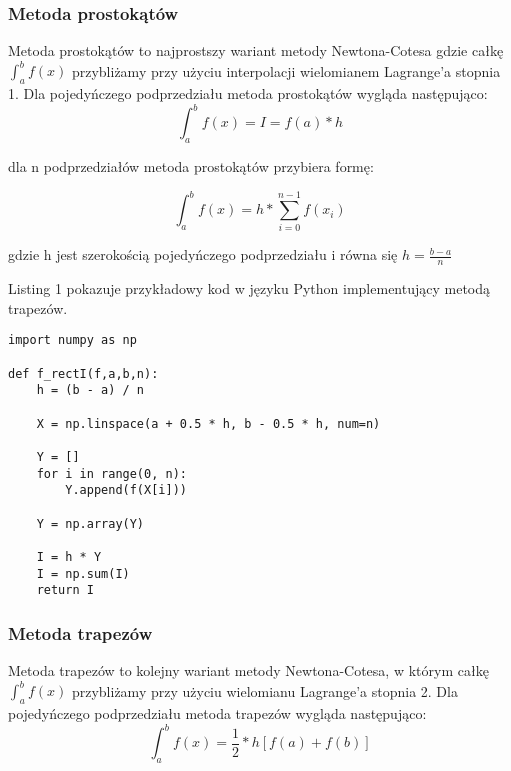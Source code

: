 \documentclass[12pt,twoside]{article}
\begin{document}
\cite{web}

\clearpage	

\subsubsection{Metoda prostokątów}

Metoda prostokątów to najprostszy wariant metody Newtona-Cotesa gdzie całkę $\int_a^b f(x)$ przybliżamy przy użyciu interpolacji wielomianem Lagrange'a stopnia 1.
Dla pojedyńczego podprzedziału metoda prostokątów wygląda następująco:
\begin{equation}
\int_a^b f(x) = I = f(a)*h
\label{Eq:rownanie}
\end{equation}

dla n podprzedziałów metoda prostokątów przybiera formę:

\begin{equation}
\int_a^b f(x) = h * \sum_{i=0}^{n-1}f(x_i)
\label{Eq:rownanie}
\end{equation}

gdzie h jest szerokością pojedyńczego podprzedziału i równa się $h = \frac{b-a}{n}$  \cite{rect}

Listing 1 pokazuje przykładowy kod w języku Python implementujący metodą trapezów.
\begin{lstlisting}[caption={Kod w języku python implementujący metodę prostokątów}]
import numpy as np

def f_rectI(f,a,b,n):
    h = (b - a) / n

    X = np.linspace(a + 0.5 * h, b - 0.5 * h, num=n)

    Y = []
    for i in range(0, n):
        Y.append(f(X[i]))

    Y = np.array(Y)

    I = h * Y
    I = np.sum(I)
    return I
\end{lstlisting}
\label{Listing 1}



\subsubsection{Metoda trapezów}
Metoda trapezów to kolejny wariant metody Newtona-Cotesa, w którym całkę $\int_a^b f(x)$ przybliżamy przy użyciu wielomianu Lagrange'a stopnia 2.
Dla pojedyńczego podprzedziału metoda trapezów wygląda następująco:
\begin{equation}
\int_a^b f(x) =  \frac{1}{2}*h[f(a) + f(b)]
\label{Eq:rownanie}
\end{equation}
\end{document}
